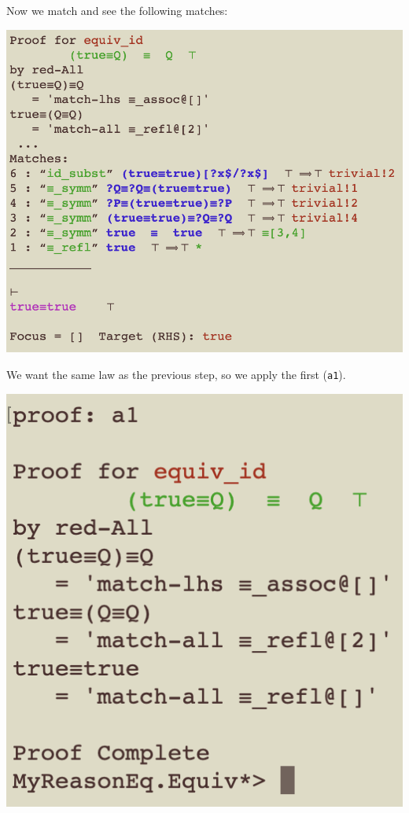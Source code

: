 \documentclass[11pt]{article}
\begin{document}
\newpage
Now we match and see the following matches:

\includegraphics[scale=0.75]{doc/images/7-m.png}

We want the same law as the previous step,
so we apply the first (\verb"a1").

\includegraphics[scale=0.75]{doc/images/8-a1.png}
\end{document}
